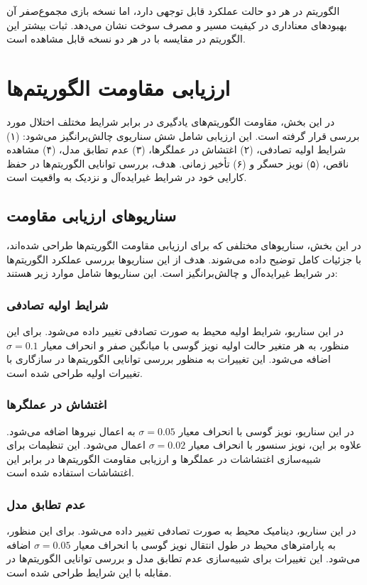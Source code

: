 الگوریتم  در هر دو حالت عملکرد قابل توجهی دارد، اما نسخه بازی مجموع‌صفر آن بهبودهای معناداری در کیفیت مسیر و مصرف سوخت نشان می‌دهد. ثبات بیشتر این الگوریتم در مقایسه با  در هر دو نسخه قابل مشاهده است.

\section{ارزیابی مقاومت الگوریتم‌ها}
\label{sec:robustness_evaluation}

در این بخش، مقاومت الگوریتم‌های یادگیری در برابر شرایط مختلف اختلال مورد بررسی قرار گرفته است. این ارزیابی شامل شش سناریوی چالش‌برانگیز می‌شود: (۱) شرایط اولیه تصادفی، (۲) اغتشاش در عملگرها، (۳) عدم تطابق مدل، (۴) مشاهده ناقص، (۵) نویز حسگر و (۶) تأخیر زمانی. هدف، بررسی توانایی الگوریتم‌ها در حفظ کارایی خود در شرایط غیرایده‌آل و نزدیک به واقعیت است.

\subsection{سناریوهای ارزیابی مقاومت}

در این بخش، سناریوهای مختلفی که برای ارزیابی مقاومت الگوریتم‌ها طراحی شده‌اند، با جزئیات کامل توضیح داده می‌شوند. هدف از این سناریوها بررسی عملکرد الگوریتم‌ها در شرایط غیرایده‌آل و چالش‌برانگیز است. این سناریوها شامل موارد زیر هستند:

\subsubsection{شرایط اولیه تصادفی}
در این سناریو، شرایط اولیه محیط به صورت تصادفی تغییر داده می‌شود. برای این منظور، به هر متغیر حالت اولیه نویز گوسی با میانگین صفر و انحراف معیار $\sigma = 0.1$ اضافه می‌شود. این تغییرات به منظور بررسی توانایی الگوریتم‌ها در سازگاری با تغییرات اولیه طراحی شده است.

\subsubsection{اغتشاش در عملگرها}
در این سناریو، نویز گوسی با انحراف معیار $\sigma = 0.05$ به اعمال نیروها اضافه می‌شود. علاوه بر این، نویز سنسور با انحراف معیار $\sigma = 0.02$ اعمال می‌شود. این تنظیمات برای شبیه‌سازی اغتشاشات در عملگرها و ارزیابی مقاومت الگوریتم‌ها در برابر این اغتشاشات استفاده شده است.

\subsubsection{عدم تطابق مدل}
در این سناریو، دینامیک محیط به صورت تصادفی تغییر داده می‌شود. برای این منظور، به پارامترهای محیط در طول انتقال نویز گوسی با انحراف معیار $\sigma = 0.05$ اضافه می‌شود. این تغییرات برای شبیه‌سازی عدم تطابق مدل و بررسی توانایی الگوریتم‌ها در مقابله با این شرایط طراحی شده است.

